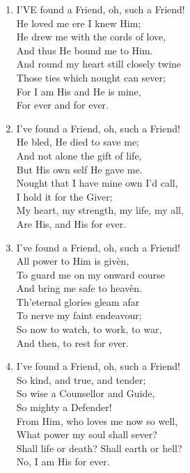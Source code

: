 \begin{enumerate}
    \item I'VE found a Friend, oh, such a Friend! \\
            He loved me ere I knew Him; \\
        He drew me with the cords of love, \\
            And thus He bound me to Him. \\
        And round my heart still closely twine \\
            Those ties which nought can sever; \\
        For I am His and He is mine, \\
            For ever and for ever.

    \item I've found a Friend, oh, such a Friend! \\
            He bled, He died to save me; \\
        And not alone the gift of life, \\
            But His own self He gave me. \\
        Nought that I have mine own I'd call, \\
            I hold it for the Giver; \\
        My heart, my strength, my life, my all, \\
            Are His, and His for ever.

    \item I've found a Friend, oh, such a Friend! \\
            All power to Him is giv\`en, \\
        To guard me on my onward course \\
            And bring me safe to heav\`en. \\
        Th'eternal glories gleam afar \\
            To nerve my faint endeavour; \\
        So now to watch, to work, to war, \\
            And then, to rest for ever.

    \item I've found a Friend, oh, such a Friend! \\
            So kind, and true, and tender; \\
        So wise a Counsellor and Guide, \\
            So mighty a Defender! \\
        From Him, who loves me now so well, \\
            What power my soul shall sever? \\
        Shall life or death? Shall earth or hell? \\
            No, I am His for ever.

\end{enumerate}

